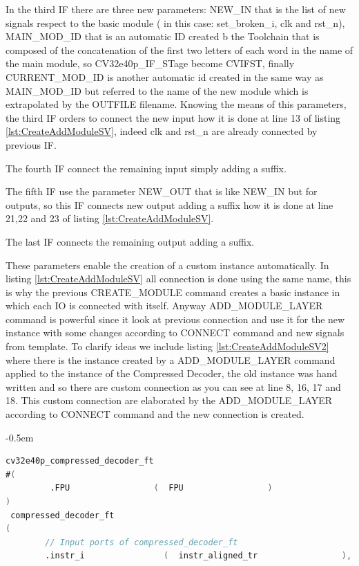 {{{\begin{itemize}
                In the third IF there are three new parameters: NEW\_IN that is the list of new signals respect to the basic module ( in this case: set\_broken\_i, clk and rst\_n), MAIN\_MOD\_ID that is an automatic ID created b the Toolchain that is composed of the concatenation of the first two letters of each word in the name of the main module, so CV32e40p\_IF\_STage become CVIFST, finally CURRENT\_MOD\_ID is another automatic id created in the same way as MAIN\_MOD\_ID but referred to the name of the new module which is extrapolated by the OUTFILE filename.
                Knowing the means of this parameters, the third IF orders to connect the new input how it is done at line 13 of listing \ref{lst:CreateAddModuleSV}, indeed clk and rst\_n are already connected by previous IF.
                
                The fourth IF connect the remaining input  simply adding a suffix.
                
                The fifth IF use the parameter NEW\_OUT that is like NEW\_IN but for outputs, so this IF connects new output adding a suffix how it is done at line 21,22 and 23 of listing \ref{lst:CreateAddModuleSV}.
                
                The last IF connects the remaining output adding a suffix.
            \end{itemize}
               
               
            These parameters enable the creation of a custom instance automatically. In listing \ref{lst:CreateAddModuleSV} all connection is done using the same name, this is why the previous CREATE\_MODULE command creates a basic instance in which each IO is connected with itself. Anyway ADD\_MODULE\_LAYER command is powerful since it look at previous connection and use it for the new instance with some changes according to CONNECT command and new signals from template. To clarify ideas we include listing \ref{lst:CreateAddModuleSV2} where there is the instance created by a ADD\_MODULE\_LAYER command applied to the instance of the Compressed Decoder, the old instance  was hand written and so there are custom connection as you can see at line 8, 16, 17 and 18. This custom connection are elaborated by the ADD\_MODULE\_LAYER according to CONNECT command and the new connection is created. 
    		
    		
    		\openup -0.5em
         
    		    \begin{lstlisting}[basicstyle=\ttfamily\scriptsize, language=Verilog, caption=SV result code after the conversion from HTV code of Compressed Decoder module, label=lst:CreateAddModuleSV2]
cv32e40p_compressed_decoder_ft
#(
         .FPU                 (  FPU                 ) 
)
 compressed_decoder_ft
(
        // Input ports of compressed_decoder_ft
        .instr_i                (  instr_aligned_tr                 ),


\end{lstlisting}}}}
